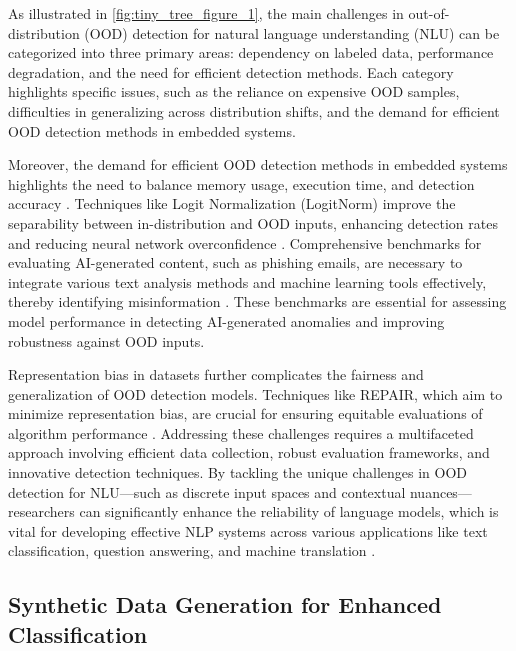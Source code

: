 As illustrated in \autoref{fig:tiny_tree_figure_1}, the main challenges in out-of-distribution (OOD) detection for natural language understanding (NLU) can be categorized into three primary areas: dependency on labeled data, performance degradation, and the need for efficient detection methods. Each category highlights specific issues, such as the reliance on expensive OOD samples, difficulties in generalizing across distribution shifts, and the demand for efficient OOD detection methods in embedded systems.

Moreover, the demand for efficient OOD detection methods in embedded systems highlights the need to balance memory usage, execution time, and detection accuracy \cite{bansal2024compressingvaebasedoutofdistributiondetectors}. Techniques like Logit Normalization (LogitNorm) improve the separability between in-distribution and OOD inputs, enhancing detection rates and reducing neural network overconfidence \cite{wei2022mitigatingneuralnetworkoverconfidence}. Comprehensive benchmarks for evaluating AI-generated content, such as phishing emails, are necessary to integrate various text analysis methods and machine learning tools effectively, thereby identifying misinformation \cite{eze2024analysispreventionaibasedphishing}. These benchmarks are essential for assessing model performance in detecting AI-generated anomalies and improving robustness against OOD inputs.

Representation bias in datasets further complicates the fairness and generalization of OOD detection models. Techniques like REPAIR, which aim to minimize representation bias, are crucial for ensuring equitable evaluations of algorithm performance \cite{li2019repairremovingrepresentationbias}. Addressing these challenges requires a multifaceted approach involving efficient data collection, robust evaluation frameworks, and innovative detection techniques. By tackling the unique challenges in OOD detection for NLU—such as discrete input spaces and contextual nuances—researchers can significantly enhance the reliability of language models, which is vital for developing effective NLP systems across various applications like text classification, question answering, and machine translation \cite{lang2023survey,HowGoodAre3}.

\subsection{Synthetic Data Generation for Enhanced Classification} \label{subsec:Synthetic Data Generation for Enhanced Classification}


